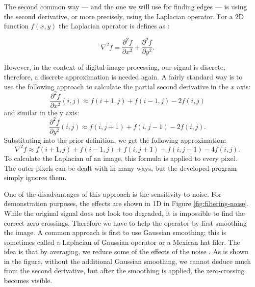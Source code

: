 \documentclass[
  digital,     %
  oneside,     %
  nosansbold,  %
  nocolorbold, %
  lof,         %
  lot,         %
]{fithesis4}
\begin{document}
The second common way --- and the one we will use for finding edges --- is using the second derivative, or more
precisely, using the Laplacian operator. For a 2D function $f(x, y)$ the Laplacian operator is
defines as \cite{gonzalez2002}:

$$\nabla^2 f = \frac{\partial^2 f}{\partial x^2} + \frac{\partial^2 f}{\partial y^2}.$$

However, in the context of digital image processing, our signal is discrete;
therefore, a discrete approximation is needed again. A fairly standard way is to use
the following approach to calculate the partial second derivative in the $x$
axis:
$$\frac{\partial^2 f}{\partial x^2}(i, j) \approx f(i + 1, j) + f(i - 1, j) - 2f(i, j)$$
and similar in the y axis:
$$\frac{\partial^2 f}{\partial y^2}(i, j) \approx f(i, j + 1) + f(i, j - 1) - 2f(i, j).$$
Substituting into the prior definition, we get the following approximation:
$$\nabla^2 f \approx f(i+1, j) + f(i-1, j) + f(i, j+1) + f(i, j-1) - 4f(i,j).$$
To calculate the Laplacian of an image, this formula is applied to every pixel.
The outer pixels can be dealt with in many ways, but the developed program simply
ignores them.


One of the disadvantages of this approach is the sensitivity to noise. For
demonstration purposes, the effects are shown in 1D in Figure
\ref{fig:filtering-noise}. While the original
signal does not look too degraded, it is impossible to find the correct
zero-crossings. Therefore we have to help the operator by first smoothing the
image. A common approach is first to use Gaussian smoothing; this is sometimes
called a Laplacian of Gaussian operator or a Mexican hat filer. The idea is that
by averaging, we reduce some of the effects of the noise
\cite{hipr-mexican-hat}. As is shown in the figure, without the additional Gaussian
smoothing, we cannot deduce much from the second derivative, but after the smoothing
is applied, the zero-crossing becomes visible.
\end{document}

